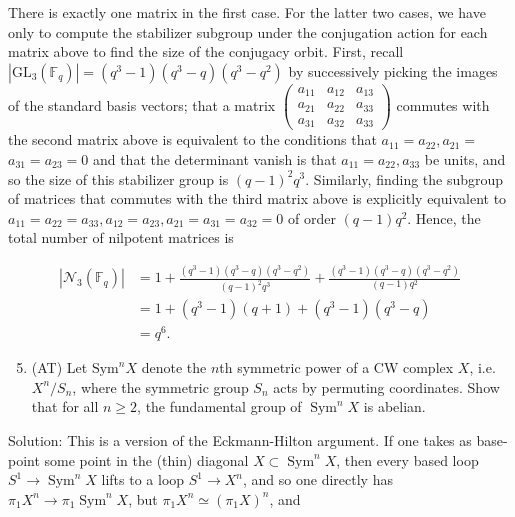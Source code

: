 \documentclass[10pt]{article}
\begin{document}
There is exactly one matrix in the first case. For the latter two cases, we have only to compute the stabilizer subgroup under the conjugation action for each matrix above to find the size of the conjugacy orbit. First, recall $\left|\mathrm{GL}_{3}\left(\mathbb{F}_{q}\right)\right|=\left(q^{3}-1\right)\left(q^{3}-q\right)\left(q^{3}-q^{2}\right)$ by successively picking the images of the standard basis vectors; that a matrix $\left(\begin{array}{lll}a_{11} & a_{12} & a_{13} \\ a_{21} & a_{22} & a_{33} \\ a_{31} & a_{32} & a_{33}\end{array}\right)$ commutes with the second matrix above is equivalent to the conditions that $a_{11}=a_{22}, a_{21}=$ $a_{31}=a_{23}=0$ and that the determinant vanish is that $a_{11}=a_{22}, a_{33}$ be units, and so the size of this stabilizer group is $(q-1)^{2} q^{3}$. Similarly, finding the subgroup of matrices that commutes with the third matrix above is explicitly equivalent to $a_{11}=a_{22}=a_{33}, a_{12}=a_{23}, a_{21}=a_{31}=a_{32}=0$ of order $(q-1) q^{2}$. Hence, the total number of nilpotent matrices is

$$
\begin{aligned}
\left|\mathcal{N}_{3}\left(\mathbb{F}_{q}\right)\right| & =1+\frac{\left(q^{3}-1\right)\left(q^{3}-q\right)\left(q^{3}-q^{2}\right)}{(q-1)^{2} q^{3}}+\frac{\left(q^{3}-1\right)\left(q^{3}-q\right)\left(q^{3}-q^{2}\right)}{(q-1) q^{2}} \\
& =1+\left(q^{3}-1\right)(q+1)+\left(q^{3}-1\right)\left(q^{3}-q\right) \\
& =q^{6} .
\end{aligned}
$$

\begin{enumerate}
  \setcounter{enumi}{4}
  \item (AT) Let $\mathrm{Sym}^{n} X$ denote the $n$th symmetric power of a CW complex $X$, i.e. $X^{n} / S_{n}$, where the symmetric group $S_{n}$ acts by permuting coordinates. Show that for all $n \geq 2$, the fundamental group of $\operatorname{Sym}^{n} X$ is abelian.
\end{enumerate}

Solution: This is a version of the Eckmann-Hilton argument. If one takes as base-point some point in the (thin) diagonal $X \subset \operatorname{Sym}^{n} X$, then every based loop $S^{1} \rightarrow \operatorname{Sym}^{n} X$ lifts to a loop $S^{1} \rightarrow X^{n}$, and so one directly has $\pi_{1} X^{n} \rightarrow \pi_{1} \operatorname{Sym}^{n} X$, but $\pi_{1} X^{n} \simeq\left(\pi_{1} X\right)^{n}$, and
\end{document}
